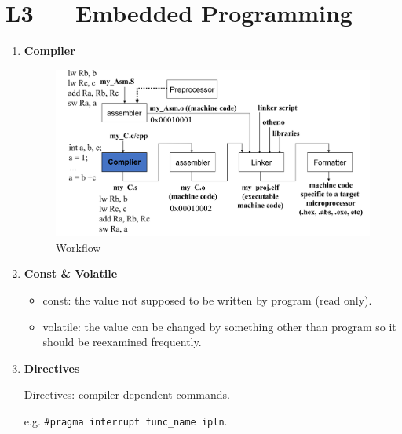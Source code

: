 \documentclass[a4paper]{article}
\begin{document}
\section*{L3 --- Embedded Programming}
  \begin{enumerate}[label = \arabic*.]
    \item \textbf{Compiler}
      \begin{figure}[H]
        \centering
        \includegraphics[width=0.9\linewidth]{Program_build_flow.jpeg}
        \caption{Workflow}
        \label{fig:Program_build_flow.jpeg}
      \end{figure}

    \item \textbf{Const \& Volatile}
      \begin{itemize}[leftmargin = 1cm]
        \item const: the value not supposed to be written by program (read only).
        \item volatile: the value can be changed by something other than program so it should be reexamined frequently.
      \end{itemize}
    \item \textbf{Directives}
      \par Directives: compiler dependent commands.
      \par e.g. \verb|#pragma interrupt func_name ipln|.
  \end{enumerate}
\end{document}
